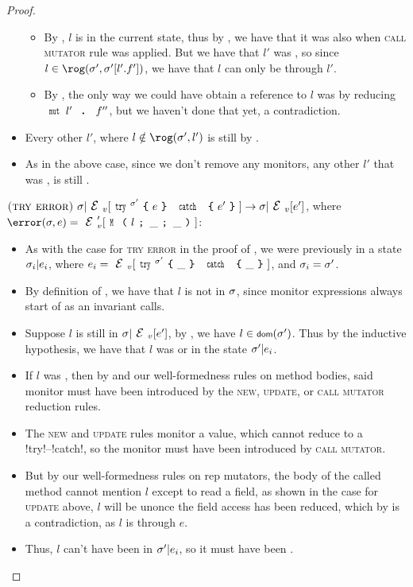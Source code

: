 \begin{proof}
\begin{ienumerate}
\begin{itemize}
\begin{itemize}
				\item By , $l$ is \muty in the current state, thus by , we have that it was also \muty when \textsc{call mutator} rule was applied.
					 But we have that $l'$ was \RCN, so since $l \in \rog(\s', \s'[l'.f'])$, we have that $l$ can only be \muty through $l'$.

				\item By , the only way we could have obtain a reference to $l$ was by reducing $\Kw{mut}\,l' \D f''$, but we haven't done that yet, a contradiction.
			\end{itemize}

		\item Every other \valid $l'$, where $l \notin \rog(\s',l')$ is still \valid by .
		\item As in the above case, since we don't remove any monitors, any other $l'$ that was \mony, is still \mony.
	\end{itemize}

			
	\item $\rrule{try error}{\s}{\trys{\s'}{e}{e'}}{\s}{e'}$, where $\error(\s, e) = \EV'[\M{l}{\_}{\_}]$:
	\begin{itemize}
		\item As with the case for \textsc{try error} in the proof of , we were previously in a state $\sigma_i|e_i$, where $e_i = \EV[\trys{\s'}{\_}{\_}]$, and $\sigma_i = \sigma'$.
		\item By definition of \error, we have that $l$ is not \valid in $\sigma$, since monitor expressions always start of as an invariant calls.
		\item Suppose $l$ is still \reach in $\s|\EV[e']$, by , we have $l \in \dom(\s')$. Thus by the inductive hypothesis, we have that $l$ was \valid or \mony in the state $\sigma'|e_i$.
		\item If $l$ was \mony, then by \VS and our well-formedness rules on method bodies, said monitor must have been introduced by the \textsc{new}, \textsc{update}, or \textsc{call mutator} reduction rules.
		\item The \textsc{new} and \textsc{update} rules monitor a value, which cannot reduce to a \Q!try!--\Q!catch!, so the monitor must have been introduced by \textsc{call mutator}.
		\item But by our well-formedness rules on rep mutators, the body of the called method cannot mention $l$ except to read a field, 
		as shown in the case for \textsc{update} above, $l$ will be un\reach once the field access has been reduced, which by  is a contradiction, as $l$ is \reach through $e$.
		\item Thus, $l$ can't have been \mony in $\sigma'|e_i$, so it must have been \valid.


\end{itemize}
\end{ienumerate}
\end{proof}
